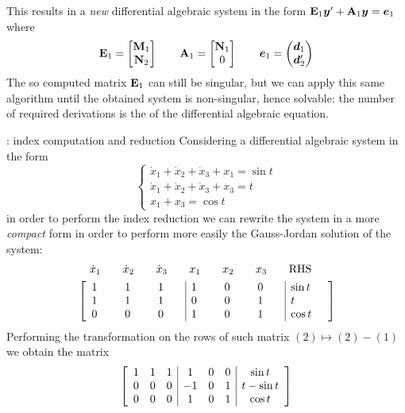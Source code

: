 	This results in a \textit{new} differential algebraic system in the form $\mathbf{E}_1 \boldsymbol{y}' + \mathbf{A}_1 \boldsymbol{y} = \boldsymbol{e}_1$ where 
	\[ \mathbf{E}_1 = \begin{bmatrix} \mathbf{M}_1 \\ \mathbf{N}_2 \end{bmatrix} \qquad \mathbf{A}_1 = \begin{bmatrix} \mathbf{N}_1 \\ 0 \end{bmatrix} \qquad \boldsymbol{e}_1 = \begin{pmatrix} \boldsymbol{d}_1 \\ \boldsymbol{d}_2' \end{pmatrix} \]
	The so computed matrix $\mathbf{E}_1$ can still be singular, but we can apply this same algorithm until the obtained system is non-singular, hence solvable: the number of required derivations is the  of the differential algebraic equation.
	
	\begin{example}{: index computation and reduction} \label{ex:dae:indexreduction}
		Considering a differential algebraic system in the form
		\[ \begin{cases}
			\dot x_1 + \dot x_2 + \dot x_3 + x_1 = \sin t \\ 
			\dot x_1 + \dot x_2 + \dot x_3 + x_3 = t \\
			x_1 + x_3 = \cos t
		\end{cases} \]
		in order to perform the index reduction we can rewrite the system in a more \textit{compact} form in order to perform more easily the Gauss-Jordan solution of the system:
		\begin{align*}
			& \hspace{2.3mm} \begin{array}{ p{0.7cm} p{0.7cm} p{0.7cm}  p{0.7cm} p{0.7cm} p{0.7cm}  p{1cm} }
				$\dot x_1$ & $\dot x_2$ & $\dot x_3$ & $x_1$ & $x_2$ & $x_3$ & RHS
			\end{array} \\
			 & \left[ \begin{array}{ p{0.7cm} p{0.7cm} p{0.7cm} | p{0.7cm} p{0.7cm} p{0.7cm} | p{1cm} }
				1 & 1 & 1 & 1 & 0 & 0 & $\sin t$ \\
				1 & 1 & 1 & 0 & 0 & 1 & $t$ \\
				0 & 0 & 0 & 1 & 0 & 1 & $\cos t$
			\end{array} \right]
		\end{align*}
		Performing the transformation on the rows of such matrix $(2) \mapsto (2)-(1)$ we obtain the matrix
		\[ \begin{bmatrix}  \begin{array}{ ccc | ccc | c }
				1 & 1 & 1 & 1 & 0 & 0 & \sin t \\
				0 & 0 & 0 & -1 & 0 & 1 & t-\sin t \\
				0 & 0 & 0 & 1 & 0 & 1 & \cos t
		\end{array}  \end{bmatrix} \]

\end{example}
